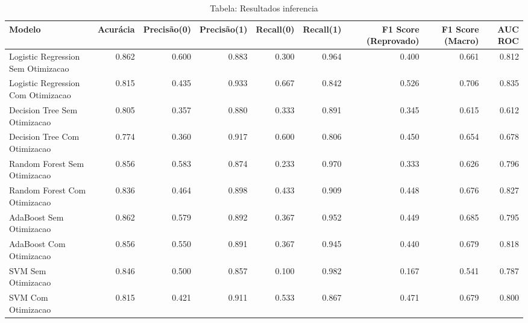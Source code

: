 \begin{table}[H] %
    \centering
    \caption{Tabela: Resultados inferencia}
    \label{tab:resultados_inferencia}
    \renewcommand{\arraystretch}{1.25} %
    \begin{adjustwidth}{ -1in }{ -1in } %
    \centering %
    \small %
    \begin{tabular}{lrrrrrrrr}
\toprule
                            Modelo &  Acurácia &  Precisão(0) &  Precisão(1) &  Recall(0) &  Recall(1) &  F1 Score (Reprovado) &  F1 Score (Macro) &  AUC ROC \\
\midrule
Logistic Regression Sem Otimizacao &     0.862 &        0.600 &        0.883 &      0.300 &      0.964 &                 0.400 &             0.661 &    0.812 \\
Logistic Regression Com Otimizacao &     0.815 &        0.435 &        0.933 &      0.667 &      0.842 &                 0.526 &             0.706 &    0.835 \\
      Decision Tree Sem Otimizacao &     0.805 &        0.357 &        0.880 &      0.333 &      0.891 &                 0.345 &             0.615 &    0.612 \\
      Decision Tree Com Otimizacao &     0.774 &        0.360 &        0.917 &      0.600 &      0.806 &                 0.450 &             0.654 &    0.678 \\
      Random Forest Sem Otimizacao &     0.856 &        0.583 &        0.874 &      0.233 &      0.970 &                 0.333 &             0.626 &    0.796 \\
      Random Forest Com Otimizacao &     0.836 &        0.464 &        0.898 &      0.433 &      0.909 &                 0.448 &             0.676 &    0.827 \\
           AdaBoost Sem Otimizacao &     0.862 &        0.579 &        0.892 &      0.367 &      0.952 &                 0.449 &             0.685 &    0.795 \\
           AdaBoost Com Otimizacao &     0.856 &        0.550 &        0.891 &      0.367 &      0.945 &                 0.440 &             0.679 &    0.818 \\
                SVM Sem Otimizacao &     0.846 &        0.500 &        0.857 &      0.100 &      0.982 &                 0.167 &             0.541 &    0.787 \\
                SVM Com Otimizacao &     0.815 &        0.421 &        0.911 &      0.533 &      0.867 &                 0.471 &             0.679 &    0.800 \\
\bottomrule
\end{tabular}
    \end{adjustwidth}
    \renewcommand{\arraystretch}{1.0} %
\end{table}
